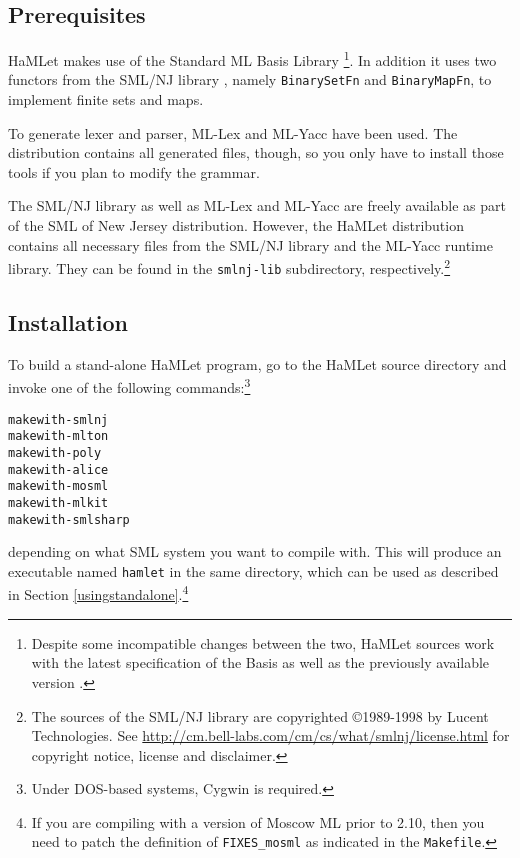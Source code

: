 \documentclass[twoside,titlepage]{article}
\newcommand{\void}[1]{}
\begin{document}
\subsection{Prerequisites}
\label{prerequisites}

HaMLet makes use of the Standard ML Basis Library \cite{basis}\footnote{Despite some incompatible changes between the two, HaMLet sources work with the latest specification of the Basis \cite{basis} as well as the previously available version \cite{basis-old}.}. In addition it uses two functors from the SML/NJ library \cite{njlib}, namely {\tt BinarySetFn} and {\tt BinaryMapFn}, to implement finite sets and maps.

To generate lexer and parser, ML-Lex \cite{mllex} and ML-Yacc \cite{mlyacc} have been used. The distribution contains all generated files, though, so you only have to install those tools if you plan to modify the grammar.

The SML/NJ library as well as ML-Lex and ML-Yacc are freely available as part of the SML of New Jersey distribution. However, the HaMLet distribution contains all necessary files from the SML/NJ library and the ML-Yacc runtime library. They can be found in the {\tt smlnj-lib} subdirectory, respectively.\footnote{The sources of the SML/NJ library are copyrighted \copyright1989-1998 by Lucent Technologies. See \url{http://cm.bell-labs.com/cm/cs/what/smlnj/license.html} for copyright notice, license and disclaimer.}


\subsection{Installation}
\label{installationstandalone}

To build a stand-alone HaMLet program\void{ under Unix-like systems}, go to the HaMLet source directory and invoke one of the following commands:\footnote{Under DOS-based systems, Cygwin is required.}
%
\begin{quoting}
\begin{alltt}
make with-smlnj
make with-mlton
make with-poly
make with-alice
make with-mosml
make with-mlkit
make with-smlsharp
\end{alltt}
\end{quoting}
%
depending on what SML system you want to compile with. This will produce an executable named {\tt hamlet} in the same directory, which can be used as described in Section \ref{usingstandalone}.\footnote{If you are compiling with a version of Moscow ML prior to 2.10, then you need to patch the definition of {\tt FIXES\_mosml} as indicated in the {\tt Makefile}.}
\end{document}
